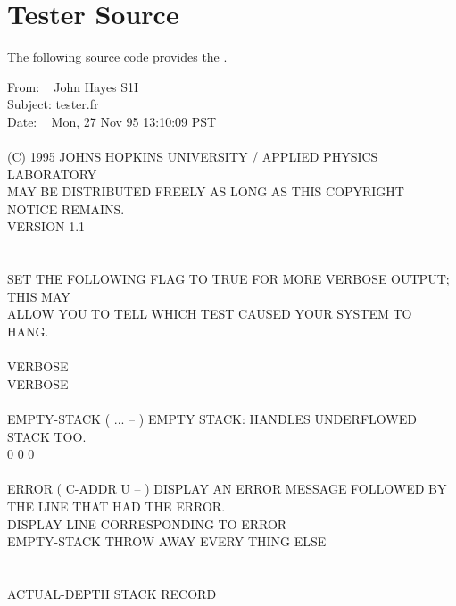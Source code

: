 \section{Tester Source}
The following source code provides the
.

\begin{tt}
 From: ~ John Hayes S1I\\
 Subject: tester.fr\\
 Date: ~ Mon, 27 Nov 95 13:10:09 PST \\
\\
 (C) 1995 JOHNS HOPKINS UNIVERSITY / APPLIED PHYSICS LABORATORY\\
 MAY BE DISTRIBUTED FREELY AS LONG AS THIS COPYRIGHT NOTICE REMAINS.\\
 VERSION 1.1\\
 \\
\\
 SET THE FOLLOWING FLAG TO TRUE FOR MORE VERBOSE OUTPUT; THIS MAY\\
 ALLOW YOU TO TELL WHICH TEST CAUSED YOUR SYSTEM TO HANG. \\
\\
 VERBOSE \\
\tab[1.2]  VERBOSE \word{!} \\
\\
\word{:} EMPTY-STACK \tab {} ( ... -- ) EMPTY STACK: HANDLES UNDERFLOWED STACK TOO. \\
\tab {}       0  0   0      \word{;} \\
\\
\word{:} ERROR \tab {} ( C-ADDR U -- ) DISPLAY AN ERROR MESSAGE FOLLOWED BY\\
\tab[5.2]  THE LINE THAT HAD THE ERROR.\\
\tab {}   		\tab[3]  DISPLAY LINE CORRESPONDING TO ERROR\\
\tab EMPTY-STACK											\tab[7.8]  THROW AWAY EVERY THING ELSE\\
\word{;} \\
\\
 ACTUAL-DEPTH \tab[3]  STACK RECORD\\

\end{tt}

